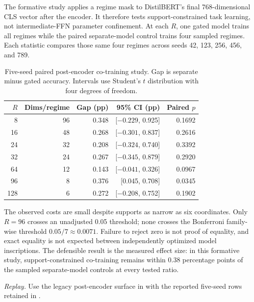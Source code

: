 \documentclass[11pt]{article}
\begin{document}
The formative study applies a regime mask to DistilBERT's final
768-dimensional CLS vector after the encoder. It therefore tests
support-constrained task learning, not intermediate-FFN parameter confinement.
At each $R$, one gated model trains all regimes while the paired separate-model
control trains four sampled regimes. Each statistic compares those same four
regimes across seeds 42, 123, 256, 456, and 789.

\begin{table}[ht]
\centering
\caption{Five-seed paired post-encoder co-training study. Gap is separate minus
gated accuracy. Intervals use Student's $t$ distribution with four degrees of
freedom.}
\label{tab:formative}
\small
\begin{tabular}{@{}rrrrr@{}}
\toprule
$R$ & Dims/regime & Gap (pp) & 95\% CI (pp) & Paired $p$ \\
\midrule
8   & 96 & 0.348 & [$-0.229$, 0.925] & 0.1692 \\
16  & 48 & 0.268 & [$-0.301$, 0.837] & 0.2616 \\
24  & 32 & 0.208 & [$-0.324$, 0.740] & 0.3392 \\
32  & 24 & 0.267 & [$-0.345$, 0.879] & 0.2920 \\
64  & 12 & 0.143 & [$-0.041$, 0.326] & 0.0967 \\
96  & 8  & 0.376 & [0.045, 0.708]    & 0.0345 \\
128 & 6  & 0.272 & [$-0.208$, 0.752] & 0.1902 \\
\bottomrule
\end{tabular}
\end{table}

The observed costs are small despite supports as narrow as six coordinates.
Only $R=96$ crosses an unadjusted 0.05 threshold; none crosses the Bonferroni
family-wise threshold $0.05/7\approx0.0071$. Failure to reject zero is not proof
of equality, and exact equality is not expected between independently optimized
model inscriptions. The defensible result is the measured effect size: in this
formative study, support-constrained co-training remains within 0.38 percentage
points of the sampled separate-model controls at every tested ratio.

{\raggedright
\noindent\textit{Replay.} Use the legacy post-encoder surface in
 with
the reported five-seed rows retained in
.\par}
\end{document}
